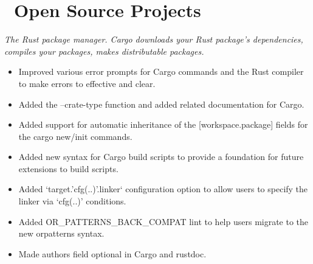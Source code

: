 \documentclass{software_engineer_rustin_liu}
\newcommand{\en}[1]{#1}
\newcommand{\zh}[1]{}
\begin{document}
\section{\faGithubAlt\ \en{Open Source Projects}\zh{开源项目}}
\en{}
\zh{\datedsubsection{\textbf{Cargo(Rust) - 活跃贡献者}}{{\href{https://github.com/search?q=repo:rust-lang/cargo+repo:rust-lang/rust+author:hi-rustin&type=commits}{260+ commits}}}}
\en{\textsl{The Rust package manager. Cargo downloads your Rust package's dependencies, compiles your packages, makes distributable packages.}}
\zh{\textsl{Rust 包管理器，Cargo 下载 Rust 包的依赖，编译包，制作可分发的包。}}

\begin{itemize}
      \item \en{Improved various error prompts for Cargo commands and the Rust compiler to make errors to effective and clear.}
            \zh{改善了大量 Cargo 命令和 Rust 编译器的错误提示，让错误更有效更清晰。}
      \item \en{Added the --crate-type function and added related documentation for Cargo.}
            \zh{为 Cargo 添加了 --crate-type 功能和相关文档。}
      \item \en{Added support for automatic inheritance of the [workspace.package] fields for the cargo new/init commands.}
            \zh{为 cargo new 和 cargo init 命令支持了 [workspace.package] 字段自动继承。}
      \item \en{Added new syntax for Cargo build scripts to provide a foundation for future extensions to build scripts.}
            \zh{为 Cargo 构建脚本添加新的语法，为未来扩展构建脚本提供基础。}
      \item \en{Added `target.'cfg(..)'.linker` configuration option to allow users to specify the linker via `cfg(..)' conditions.}
            \zh{添加了 `target.'cfg(..)'.linker` 配置项，允许用户通过 `cfg(..)' 条件来指定链接器。}
      \item \en{Added OR\_PATTERNS\_BACK\_COMPAT lint to help users migrate to the new or\-patterns syntax.}
            \zh{添加了 OR\_PATTERNS\_BACK\_COMPAT lint 来帮助用户迁移至新的 or\-patterns 语法。}
      \item \en{Made authors field optional in Cargo and rustdoc.}
            \zh{使 authors 字段在 Cargo 和 rustdoc 中可选。}
\end{itemize}
\end{document}

